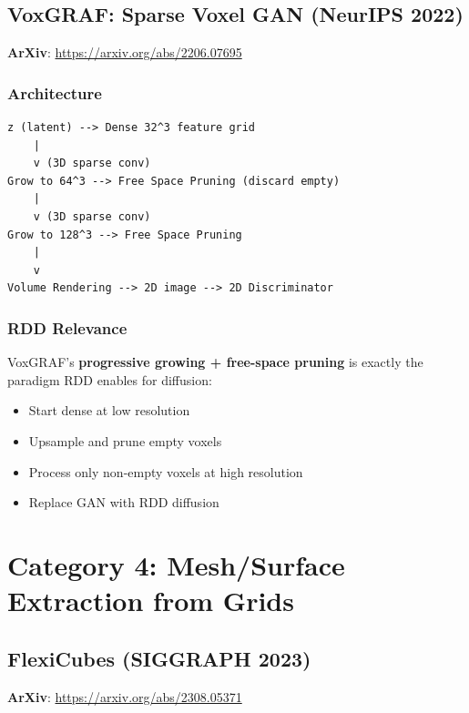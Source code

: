 \documentclass[11pt, a4paper]{article}
\begin{document}
\subsection{VoxGRAF: Sparse Voxel GAN (NeurIPS 2022)}

\textbf{ArXiv}: \url{https://arxiv.org/abs/2206.07695}

\subsubsection{Architecture}

\begin{lstlisting}[style=flowchart, caption={VoxGRAF Progressive Growing}]
z (latent) --> Dense 32^3 feature grid
    |
    v (3D sparse conv)
Grow to 64^3 --> Free Space Pruning (discard empty)
    |
    v (3D sparse conv)  
Grow to 128^3 --> Free Space Pruning
    |
    v
Volume Rendering --> 2D image --> 2D Discriminator
\end{lstlisting}

\subsubsection{RDD Relevance}

VoxGRAF's \textbf{progressive growing + free-space pruning} is exactly the paradigm RDD enables for diffusion:
\begin{itemize}
    \item Start dense at low resolution
    \item Upsample and prune empty voxels
    \item Process only non-empty voxels at high resolution
    \item Replace GAN with RDD diffusion
\end{itemize}

\section{Category 4: Mesh/Surface Extraction from Grids}

\subsection{FlexiCubes (SIGGRAPH 2023)}

\textbf{ArXiv}: \url{https://arxiv.org/abs/2308.05371}
\end{document}
